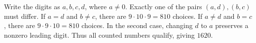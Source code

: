 Write the digits as $a,b,c,d$, where $a\ne0$. Exactly one of the pairs $(a,d),(b,c)$ must differ. If $a=d$ and $b\ne c$, there are $9\cdot10\cdot9=810$ choices. If $a\ne d$ and $b=c$, there are $9\cdot9\cdot10=810$ choices. In the second case, changing $d$ to $a$ preserves a nonzero leading digit. Thus all counted numbers qualify, giving $\boxed{1620}$.
